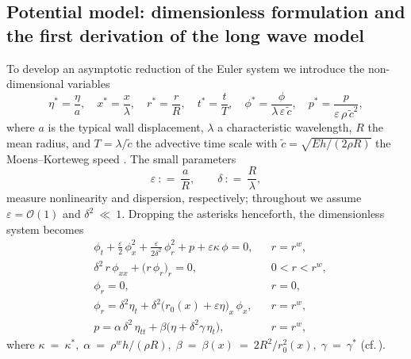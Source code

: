 \documentclass[alpha-refs, 12pt]{wiley-article}
\renewcommand{\O}{\mathcal{O}}
\newcommand{\eqdef}{\mathrel{\mathop:}=}
\begin{document}
\subsection{Potential model: dimensionless formulation and the first derivation of the long wave model}\label{sec:dimless_longwave}

To develop an asymptotic reduction of the Euler system we introduce the non-dimensional variables
\begin{equation}\label{eq:ndv}
  \eta^{\ast}=\frac{\eta}{a},\quad
  x^{\ast}=\frac{x}{\lambda},\quad
  r^{\ast}=\frac{r}{R},\quad
  t^{\ast}=\frac{t}{T},\quad
  \phi^{\ast}=\frac{\phi}{\lambda\,\varepsilon\,\tilde{c}},\quad
  p^{\ast}=\frac{p}{\varepsilon\,\rho\,\tilde{c}^{2}},
\end{equation}
where $a$ is the typical wall displacement, $\lambda$ a characteristic wavelength, $R$ the mean radius, and $T=\lambda/\tilde{c}$ the advective time scale with
\(
  \tilde{c}=\sqrt{E h/(2\rho R)}
\)
the Moens--Korteweg speed \cite{Fung2013}. The small parameters
\begin{equation}\label{eq:eps_del}
  \varepsilon\ \eqdef\ \frac{a}{R}, \qquad \delta\ \eqdef\ \frac{R}{\lambda},
\end{equation}
measure nonlinearity and dispersion, respectively; throughout we assume $\varepsilon = \O(1)$ and $\delta^{2}\ \ll\ 1$. Dropping the asterisks henceforth, the dimensionless system becomes
\begin{align}
  & \phi_{t}
    +\tfrac{\varepsilon}{2}\,\phi_{x}^{2}
    +\tfrac{\varepsilon}{2\delta^{2}}\,
     \phi_{r}^{2}
    +p
    +\varepsilon\kappa\,\phi
    =0,
    && r=r^{w}, \label{eq1}\\[2pt]
  & \delta^{2}\,r\,\phi_{xx}
    +\bigl(r\,\phi_{r}\bigr)_{r}
    =0,
    && 0<r<r^{w}, \label{eq2}\\[2pt]
  & \phi_{r}=0,
    && r=0, \label{eq3}\\[2pt]
  & \phi_{r}
    =\delta^{2}\eta_{t}
     +\delta^{2}\bigl(r_{0}(x)+\varepsilon\eta\bigr)_{x}\,\phi_{x},
    && r=r^{w}, \label{eq4}\\[2pt]
  & p
    =\alpha\,\delta^{2}\,\eta_{tt}
     +\beta\bigl(\eta+\delta^{2}\gamma\,\eta_{t}\bigr),
    && r=r^{w}, \label{eq5}
\end{align}
where
\(
  \kappa\ =\ \kappa^{\ast},\;
  \alpha\ =\ \rho^{w}h/(\rho R),\;
  \beta\ =\ \beta(x)\ =\ 2R^{2}/r_{0}^{2}(x),\;
  \gamma\ =\ \gamma^{\ast}
\)
(cf.\,\cite{Mitsotakis2019}).
\end{document}
